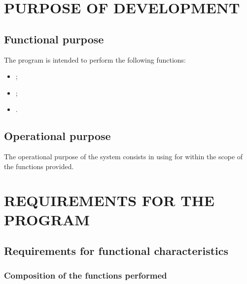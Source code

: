 \documentclass[12pt,a4paper]{extarticle}
\begin{document}
\clearpage

\section{PURPOSE OF DEVELOPMENT}

\subsection{Functional purpose}

The program is intended to perform the following functions:
\begin{itemize}[nosep, leftmargin=1.25cm]
    \item {};
    \item {};
    \item {}.
\end{itemize}

\subsection{Operational purpose}

The operational purpose of the system consists in using  for  within the scope of the functions provided.

\clearpage

\section{REQUIREMENTS FOR THE PROGRAM}

\subsection{Requirements for functional characteristics}
\label{sec:functional_reqs}

\subsubsection{Composition of the functions performed}
\end{document}
